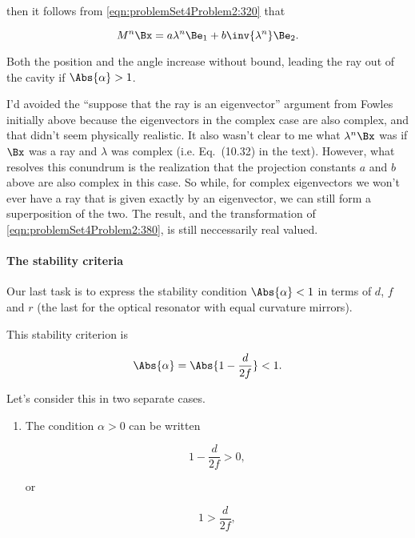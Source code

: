 {then it follows from \ref{eqn:problemSet4Problem2:320} that

\begin{dmath}\label{eqn:problemSet4Problem2:380}
M^n \Bx = a \lambda^n \Be_1 + b \inv{\lambda^n} \Be_2.
\end{dmath}

Both the position and the angle increase without bound, leading the ray out of the cavity if $\Abs{\alpha} > 1$.  

I'd avoided the ``suppose that the ray is an eigenvector'' argument from Fowles initially above because the eigenvectors in the complex case are also complex, and that didn't seem physically realistic.  It also wasn't clear to me what $\lambda^n \Bx$ was if $\Bx$ was a ray and $\lambda$ was complex (i.e.  Eq.~(10.32) in the text).  However, what resolves this conundrum is the realization that the projection constants $a$ and $b$ above are also complex in this case.  So while, for complex eigenvectors we won't ever have a ray that is given exactly by an eigenvector, we can still form a superposition of the two.  The result, and the transformation of \ref{eqn:problemSet4Problem2:380}, is still neccessarily real valued.

\paragraph{The stability criteria}

Our last task is to express the stability condition $\Abs{\alpha} < 1$ in terms of $d$, $f$ and $r$ (the last for the optical resonator with equal curvature mirrors).

This stability criterion is 

\begin{equation}\label{eqn:problemSet4Problem2:400}
\Abs{\alpha} = \Abs{1 - \frac{d}{2f}} < 1.
\end{equation}

Let's consider this in two separate cases.
\begin{enumerate}
\item The condition $\alpha > 0$ can be written

\begin{dmath}\label{eqn:problemSet4Problem2:420}
1 - \frac{d}{2f} > 0 ,
\end{dmath}

or

\begin{dmath}\label{eqn:problemSet4Problem2:560}
1 > \frac{d}{2f},
\end{dmath}


\end{enumerate}}
